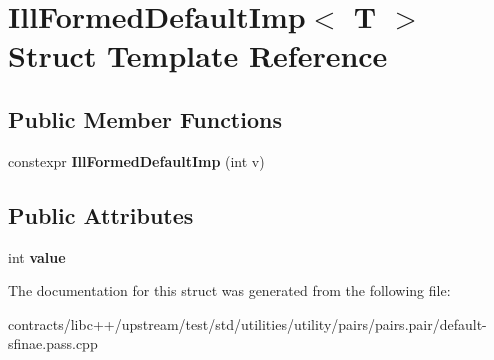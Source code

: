 \hypertarget{struct_ill_formed_default_imp}{}\section{Ill\+Formed\+Default\+Imp$<$ T $>$ Struct Template Reference}
\label{struct_ill_formed_default_imp}
\subsection*{Public Member Functions}
\begin{DoxyCompactItemize}
\item 
\mbox{\label{struct_ill_formed_default_imp_a6806b24edb3b04420c582404515afbe6}} 
constexpr {\bfseries Ill\+Formed\+Default\+Imp} (int v)
\end{DoxyCompactItemize}
\subsection*{Public Attributes}
\begin{DoxyCompactItemize}
\item 
\mbox{\label{struct_ill_formed_default_imp_a0b4ccc9e3a85dfc3a29c2a77b41591fd}} 
int {\bfseries value}
\end{DoxyCompactItemize}


The documentation for this struct was generated from the following file\+:\begin{DoxyCompactItemize}
\item 
contracts/libc++/upstream/test/std/utilities/utility/pairs/pairs.\+pair/default-\/sfinae.\+pass.\+cpp\end{DoxyCompactItemize}

